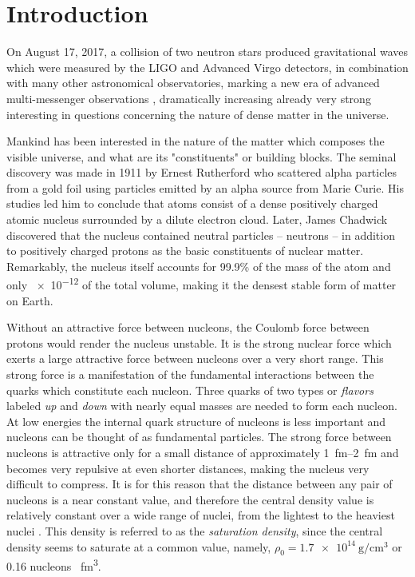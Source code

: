 \chapter{Introduction}
On August 17, 2017, a collision of two  neutron stars produced gravitational waves which were measured by the LIGO and Advanced Virgo detectors, in combination with many other astronomical observatories, marking a new era of advanced multi-messenger observations \cite{ns_2017}, dramatically increasing already very strong interesting in  questions concerning the nature of dense matter in the universe.

Mankind has been interested in the nature of the matter which composes the visible universe, and what are its "constituents" or building blocks. The seminal discovery was made in 1911 by Ernest Rutherford who scattered alpha particles from a gold foil using particles emitted by an alpha source from Marie Curie. His studies led him to conclude that atoms consist of a dense positively charged atomic nucleus surrounded by a dilute electron cloud. Later,  James Chadwick  discovered that the nucleus contained neutral particles -- neutrons  -- in addition to positively charged protons as the basic constituents of nuclear matter. Remarkably, the nucleus itself accounts for 99.9\% of the mass of the atom and only \num{e-12} of the total volume, making it the densest stable form of matter on Earth. 

Without an attractive force between nucleons, the Coulomb force between protons would render the nucleus unstable. It is the strong nuclear force which exerts a large attractive force  between nucleons over a very short range. This strong force is a manifestation of the fundamental interactions between the quarks which constitute each nucleon. Three quarks of two types or \emph{flavors} labeled \emph{up} and \emph{down} with nearly equal masses are needed to form each nucleon. At low energies the internal quark structure of nucleons is less important and nucleons can be thought of as fundamental particles. The strong force between nucleons is attractive only for a small distance of approximately \SIrange{1}{2}{\femto\metre} and becomes very repulsive at even shorter distances, making the nucleus very difficult to compress. It is for this reason that the distance between any pair of nucleons is a near constant value, and therefore the central density value is relatively constant over a wide range of nuclei, from the lightest to the heaviest nuclei \cite{krane}. This density is referred to as the  \emph{saturation density}, since the central density seems to saturate at a common value, namely, $\rho_0 = \SI{1.7e14}{\gram\per\centi\metre\cubed}$ or \num{0.16} nucleons \si{\per\femto\metre\cubed}.  

